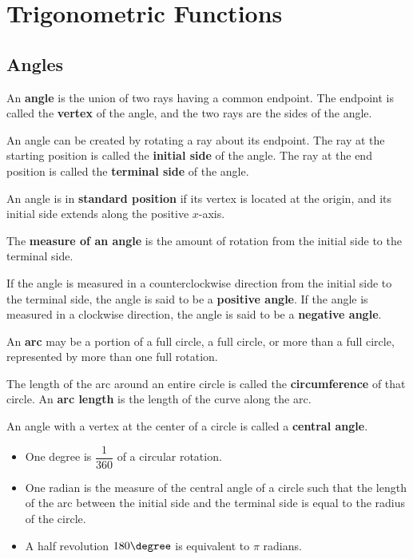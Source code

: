 
\chapter{Trigonometric Functions}

\section{Angles}
\begin{definition}
  An \textbf{angle} is the union of two rays having a common endpoint. The endpoint is called the \textbf{vertex} of the angle, and the two rays are the sides of the angle. 
  
  An angle can be created by rotating a ray about its endpoint. The ray at the starting position is called the \textbf{initial side} of the angle. The ray at the end position is called the \textbf{terminal side} of the angle. 
  
  An angle is in \textbf{standard position} if its vertex is located at the origin, and its initial side extends along the positive $x$-axis. 
  
  The \textbf{measure of an angle} is the amount of rotation from the initial side to the terminal side.

  If the angle is measured in a counterclockwise direction from the initial side to the terminal side, the angle is said to be a \textbf{positive angle}. If the angle is measured in a clockwise direction, the angle is said to be a \textbf{negative angle}.
\end{definition}

\begin{definition}
  An \textbf{arc} may be a portion of a full circle, a full circle, or more than a full circle, represented by more than one full rotation. 
  
  The length of the arc around an entire circle is called the \textbf{circumference} of that circle. An \textbf{arc length} is the length of the curve along the arc. 

  An angle with a vertex at the center of a circle is called a \textbf{central angle}.
\end{definition}

\begin{howto}
  \begin{itemize}
    \item One degree is $\dfrac{1}{360}$ of a circular rotation.
    \item One radian is the measure of the central angle of a circle such that the length of the arc between the initial side and the terminal side is equal to the radius of the circle. 
    \item A half revolution $180\degree$ is equivalent to $\pi$ radians.
  \end{itemize}
\end{howto}


